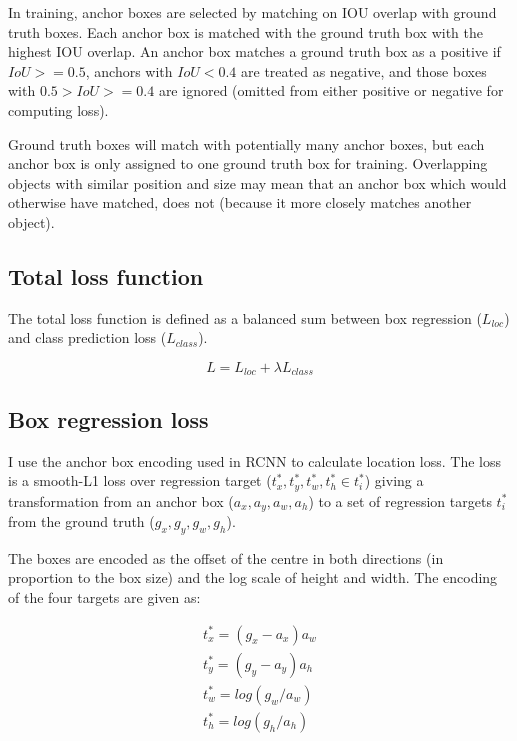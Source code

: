 In training, anchor boxes are selected by matching on \gls{IOU} overlap with ground truth boxes. Each anchor box is matched with the ground truth box with the highest \gls{IOU} overlap. An anchor box matches a ground truth box as a positive if $ IoU >= 0.5 $, anchors with $ IoU < 0.4 $ are treated as negative, and those boxes with $ 0.5 > IoU >= 0.4 $ are ignored (omitted from either positive or negative for computing loss).

Ground truth boxes will match with potentially many anchor boxes, but each anchor box is only assigned to one ground truth box for training.  Overlapping objects with similar position and size may mean that an anchor box which would otherwise have matched, does not (because it more closely matches another object).

\subsection{Total loss function}

The total loss function is defined as a balanced sum between box regression ($L_{loc}$) and class prediction loss ($L_{class}$). 

\begin{equation}
L  = L_{loc} + \lambda L_{class}
\label{eq:loss_total}
\end{equation}

\subsection {Box regression loss}
\label{sec:regression}


I use the anchor box encoding used in \gls{RCNN} \cite{Wang2017} to calculate location loss. The loss is a smooth-L1 loss over regression target ($t^*_x, t^*_y, t^*_w, t^*_h \in t^*_i$) giving a transformation from an anchor box ($a_x, a_y, a_w, a_h$)  to a set of regression targets $t^*_i$ from the ground truth ($g_x, g_y, g_w, g_h$). 

The boxes are encoded as the offset of the centre in both directions (in proportion to the box size) and the log scale of height and width. The encoding of the four targets are given as:

\begin{equation}
\begin{split}
t^*_x = (g_x - a_x) a_w\\
t^*_y = (g_y - a_y) a_h\\
t^*_w = log(g_w / a_w)\\
t^*_h = log(g_h / a_h)\\
\end{split}
\label{eq:encoding_rcnn}
\end{equation}

